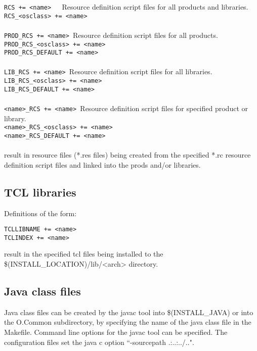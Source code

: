 \noindent\verb|RCS += <name>   |Resource definition script files for all products and libraries.\\
\verb|RCS_<osclass> += <name>|\\
\verb||\\
\verb|PROD_RCS += <name> |Resource definition script files for all products.\\
\verb|PROD_RCS_<osclass> += <name>|\\
\verb|PROD_RCS_DEFAULT += <name>|\\
\verb||\\
\verb|LIB_RCS += <name> |Resource definition script files for all libraries.\\
\verb|LIB_RCS_<osclass> += <name>|\\
\verb|LIB_RCS_DEFAULT += <name>|\\
\verb||\\
\verb|<name>_RCS += <name> |Resource definition script files for specified product or library.\\
\verb|<name>_RCS_<osclass> += <name>|\\
\verb|<name>_RCS_DEFAULT += <name>|\\
\verb||\\
result in resource files (*.res files) being created from the specified *.rc resource definition script files and linked into the 
prods and/or libraries.

\subsection{TCL libraries}

Definitions of the form:

\begin{verbatim}TCLLIBNAME += <name>
TCLINDEX += <name>
\end{verbatim}
result in the specified tcl files being installed to the \$(INSTALL\_LOCATION)/lib/\textless{}arch\textgreater{} directory.

\subsection{Java class files}

Java class files can be created by the javac tool into \$(INSTALL\_JAVA) or into the O.Common subdirectory, by 
specifying the name of the java class file in the Makefile. Command line options for the javac tool can be specified. The 
configuration files set the java c option ``-sourcepath .:..:../..".

